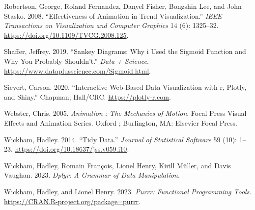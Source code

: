 \begin{CSLReferences}{1}{0}
\leavevmode{}%
Robertson, George, Roland Fernandez, Danyel Fisher, Bongshin Lee, and John Stasko. 2008. {``Effectiveness of Animation in Trend Visualization.''} \emph{IEEE Transactions on Visualization and Computer Graphics} 14 (6): 1325--32. \url{https://doi.org/10.1109/TVCG.2008.125}.

\leavevmode{}%
Shaffer, Jeffrey. 2019. {``Sankey Diagrams: Why i Used the Sigmoid Function and Why You Probably Shouldn't.''} \emph{Data + Science}. \url{https://www.dataplusscience.com/Sigmoid.html}.

\leavevmode{}%
Sievert, Carson. 2020. {``Interactive {Web-Based} Data Visualization with r, Plotly, and Shiny.''} Chapman; Hall/CRC. \url{https://plotly-r.com}.

\leavevmode{}%
Webster, Chris. 2005. \emph{Animation : The Mechanics of Motion}. Focal Press Visual Effects and Animation Series. Oxford ; Burlington, MA: Elsevier Focal Press.

\leavevmode{}%
Wickham, Hadley. 2014. {``Tidy Data.''} \emph{Journal of Statistical Software} 59 (10): 1--23. \url{https://doi.org/10.18637/jss.v059.i10}.

\leavevmode{}%
Wickham, Hadley, Romain François, Lionel Henry, Kirill Müller, and Davis Vaughan. 2023. \emph{Dplyr: A Grammar of Data Manipulation}.

\leavevmode{}%
Wickham, Hadley, and Lionel Henry. 2023. \emph{Purrr: Functional Programming Tools}. \url{https://CRAN.R-project.org/package=purrr}.

\end{CSLReferences}



\address{%
Krisanat Anukarnsakulchularp\\
Monash University\\%
Department of Econometrics and Business Statistics\\ Melbourne, Australia\\
%
%
\textit{ORCiD: \href{https://orcid.org/0009-0008-5638-7124}{0009-0008-5638-7124}}\\%
\href{mailto:kanu0003@student.monash.edu}{\nolinkurl{kanu0003@student.monash.edu}}%
}

\address{%
Dianne Cook\\
Monash University\\%
Department of Econometrics and Business Statistics\\ Melbourne, Australia\\
%
%
\textit{ORCiD: \href{https://orcid.org/0000-0002-3813-7155}{0000-0002-3813-7155}}\\%
\href{mailto:dicook@monash.edu}{\nolinkurl{dicook@monash.edu}}%
}
